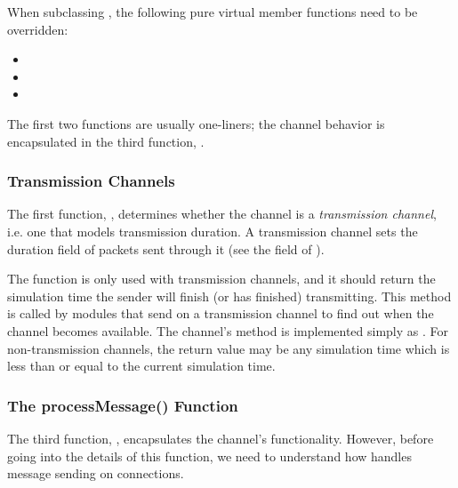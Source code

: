 When subclassing , the following pure virtual member functions
need to be overridden:

\begin{itemize}
  \item {}
  \item {}
  \item {}
\end{itemize}

The first two functions are usually one-liners; the channel behavior is
encapsulated in the third function, .

\subsubsection{Transmission Channels}
\label{sec:simple-modules:transmission-channels}

The first function, , determines whether
the channel is a \textit{transmission channel}, i.e. one that models
transmission duration. A transmission channel sets the duration field of
packets sent through it (see the  field of
).

The  function is only used with
transmission channels, and it should return the simulation time the sender
will finish (or has finished) transmitting. This method is called by
modules that send on a transmission channel to find out when the channel
becomes available. The channel's  method is implemented
simply as . For
non-transmission channels, the  return
value may be any simulation time which is less than or equal to the current
simulation time.

\subsubsection{The processMessage() Function}
\label{sec:simple-modules:channel-processmessage}

The third function, , encapsulates the channel's
functionality. However, before going into the details of this function,
we need to understand how {\opp} handles message sending on connections.

